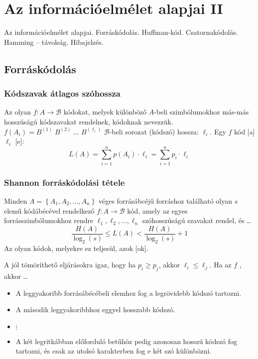 \documentclass[../main.tex]{subfiles}
\begin{document}
\section{Az információelmélet alapjai II}

\begin{fulltheorem}
  Az információelmélet alapjai. Forráskódolás. Huffman-kód. Csatornakódolás.
  Hamming -- távolság. Hibajelzés.
\end{fulltheorem}

\subsection{Forráskódolás}

\subsubsection*{Kódszavak átlagos szóhossza}

Az olyan $f: A \rightarrow \mathcal{B}$ kódokat, melyek különböző $A$-beli
szimbólumokhoz más-más hosszúságú kódszavakat rendelnek,
 kódoknak nevezzük.
$f(A_i) = B^{(1)} \; B^{(2)} \; \dots \; B^{(\ell_i)}$
$\mathcal{B}$-beli sorozat (kódszó) hossza: ${\ell_i}$.
Egy $f$ kód [a] $\ell_i$ [e]:
\[
  L(A) = \sum_{i=1}^n p(A_i) \cdot \ell_i =
  \sum_{i=1}^n p_i \cdot\ell_i
\]

\subsubsection*{Shannon forráskódolási tétele}

Minden $A = \left\{ A_1, A_2, \dots , A_n \right\}$
véges forrásábcéjű forráshoz található olyan $s$ elemű
kódábécével rendelkező $f: A \rightarrow \mathcal{B}$
kód, amely az egyes forrásszimbólumokhoz rendre
$\ell_1, \ell_2, \dots, \ell_n$ szóhosszúságú szavakat
rendel, és \dots
\[
  \frac{H(A)}{\log_2(s)}
  \leq L(A)
  < \frac{H(A)}{\log_2(s)} + 1
\]
Az olyan kódok, melyekre ez teljesül, azok [ok].

A jól tömöríthető eljárásokra igaz, hogy ha $p_i \geq p_j$,
akkor $\ell_i \leq \ell_j$. Ha az $f$  ,
akkor \dots
\begin{itemize}
  \item A leggyakoribb forrásábécébeli elemhez
        fog a legrövidebb kódszó tartozni.

  \item A második leggyakoribbhoz eggyel hosszabb kódszó.

  \item $\vdots$

  \item A két legritkábban előforduló betűhöz
        pedig azonosan hosszú kódszó fog tartozni,
        és csak az utolsó karakterben fog e két szó különbözni.
\end{itemize}
\end{document}
